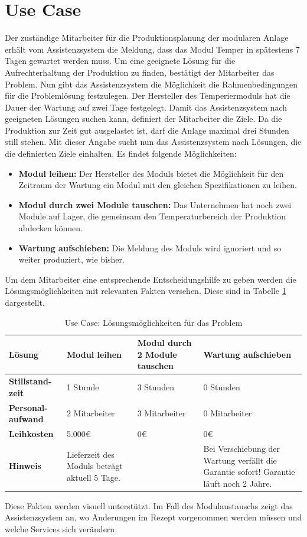 \section{Use Case}
Der zuständige Mitarbeiter für die Produktionsplanung der modularen Anlage erhält vom Assistenzsystem die Meldung, dass das Modul Temper in spätestens 7 Tagen gewartet werden muss. Um eine geeignete Lösung für die Aufrechterhaltung der Produktion zu finden, bestätigt der Mitarbeiter das Problem. Nun gibt das Assistenzsystem die Möglichkeit die Rahmenbedingungen für die Problemlösung festzulegen. Der Hersteller des Temperiermoduls hat die Dauer der Wartung auf zwei Tage festgelegt. Damit das Assistenzsystem nach geeigneten Lösungen suchen kann, definiert der Mitarbeiter die Ziele. Da die Produktion zur Zeit gut ausgelastet ist, darf die Anlage maximal drei Stunden still stehen. Mit dieser Angabe sucht nun das Assistenzsystem nach Lösungen, die die definierten Ziele einhalten. Es findet folgende Möglichkeiten:
\begin{itemize}
\item \textbf{Modul leihen:} Der Hersteller des Moduls bietet die Möglichkeit für den Zeitraum der Wartung ein Modul mit den gleichen Spezifikationen zu leihen.
\item \textbf{Modul durch zwei Module tauschen:} Das Unternehmen hat noch zwei Module auf Lager, die gemeinsam den Temperaturbereich der Produktion abdecken können.
\item \textbf{Wartung aufschieben:} Die Meldung des Moduls wird ignoriert und so weiter produziert, wie bisher.
\end{itemize}
Um dem Mitarbeiter eine entsprechende Entscheidungshilfe zu geben werden die Lösungsmöglichkeiten mit relevanten Fakten versehen. Diese sind in Tabelle \ref{tab:UseCase-Lösungen} dargestellt.

\begin{table}[htb]
\centering
\caption{Use Case: Lösungsmöglichkeiten für das Problem}
\begin{tabular}{|p{}|p{}|p{}|p{}|}
\hline
\textbf{Lösung} & Modul leihen & Modul durch 2 Module tauschen & Wartung aufschieben \\
\hline
\textbf{Stillstand-zeit} & 1 Stunde & 3 Stunden & 0 Stunden \\
\hline
\textbf{Personal-aufwand	} & 2 Mitarbeiter & 3 Mitarbeiter & 0 Mitarbeiter \\
\hline
\textbf{Leihkosten} & 5.000€ & 0€ & 0€ \\
\hline
\textbf{Hinweis} & Lieferzeit des Moduls beträgt aktuell 5 Tage. & & Bei Verschiebung der Wartung verfällt die Garantie sofort! Garantie läuft noch 2 Jahre. \\
\hline
\end{tabular}
\label{tab:UseCase-Lösungen}
\end{table}
Diese Fakten werden visuell unterstützt. Im Fall des Modulaustauschs zeigt das Assistenzsystem an, wo Änderungen im Rezept vorgenommen werden müssen und welche Services sich verändern.

